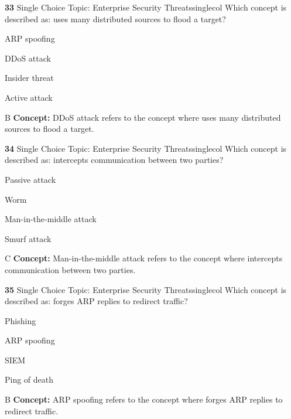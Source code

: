 \documentclass[10pt,a4paper]{article}
\begin{document}
\begin{qcard}{\color{white}\textbf{33} \hfill \small Single Choice \textbar{} Topic: Enterprise Security Threats}{singlecol}
Which concept is described as: uses many distributed sources to flood a target?

\begin{qoptions}
\item ARP spoofing
\item DDoS attack
\item Insider threat
\item Active attack
\end{qoptions}
\begin{explainbox}{B}
\textbf{Concept:} DDoS attack refers to the concept where uses many distributed sources to flood a target.
\end{explainbox}
\end{qcard}

\begin{qcard}{\color{white}\textbf{34} \hfill \small Single Choice \textbar{} Topic: Enterprise Security Threats}{singlecol}
Which concept is described as: intercepts communication between two parties?

\begin{qoptions}
\item Passive attack
\item Worm
\item Man-in-the-middle attack
\item Smurf attack
\end{qoptions}
\begin{explainbox}{C}
\textbf{Concept:} Man-in-the-middle attack refers to the concept where intercepts communication between two parties.
\end{explainbox}
\end{qcard}

\begin{qcard}{\color{white}\textbf{35} \hfill \small Single Choice \textbar{} Topic: Enterprise Security Threats}{singlecol}
Which concept is described as: forges ARP replies to redirect traffic?

\begin{qoptions}
\item Phishing
\item ARP spoofing
\item SIEM
\item Ping of death
\end{qoptions}
\begin{explainbox}{B}
\textbf{Concept:} ARP spoofing refers to the concept where forges ARP replies to redirect traffic.
\end{explainbox}
\end{qcard}
\end{document}
